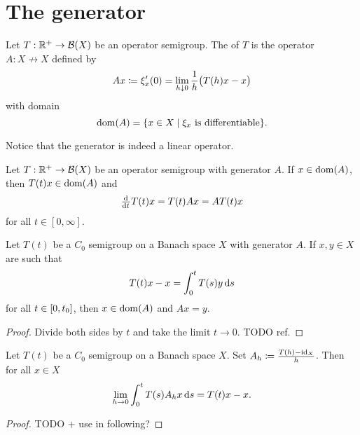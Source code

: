 \section{The generator}
\begin{definition}
Let $T: \mathbb{R}^+\to \operatorname{\mathcal{B}}(X)$ be an operator semigroup. The  of $T$ is the operator $A: X\not\to X$ defined by
\[ Ax \coloneqq \xi_x'(0) = \lim_{h\downarrow 0}\frac{1}{h}\big(T(h)x - x\big) \]
with domain
\[ \dom(A) = \setbuilder{x\in X}{\text{$\xi_x$ is differentiable}}. \]
\end{definition}
Notice that the generator is indeed a linear operator.

\begin{lemma} \label{differentialOperatorSemigroupGenerator}
Let $T: \mathbb{R}^+\to \operatorname{\mathcal{B}}(X)$ be an operator semigroup with generator $A$. If $x\in\operatorname{dom}(A)$, then $T(t)x\in\operatorname{dom}(A)$ and
\[ \od{}{t}T(t)x = T(t)Ax = AT(t)x \]
for all $t\in [0,\infty]$.
\end{lemma}

\begin{lemma} \label{domainGeneratorLemma}
Let $T(t)$ be a $C_0$ semigroup on a Banach space $X$ with generator $A$. If $x,y\in X$ are such that
\[ T(t)x-x = \int_0^tT(s)y\operatorname{d \!}{s} \]
for all $t\in\interval{0,t_0}$, then $x\in\operatorname{dom}(A)$ and $Ax = y$.
\end{lemma}
\begin{proof}
Divide both sides by $t$ and take the limit $t\to 0$. TODO ref.
\end{proof}

\begin{lemma} \label{convergenceGeneratorUnderIntegral}
Let $T(t)$ be a $C_0$ semigroup on a Banach space $X$. Set $A_h \coloneqq \frac{T(h) - \operatorname{id}_X}{h}$. Then for all $x\in X$
\[ \lim_{h\to 0}\int_0^t T(s)A_hx\operatorname{d \!}{s} = T(t)x-x. \]
\end{lemma}
\begin{proof}
TODO + use in following?
\end{proof}

